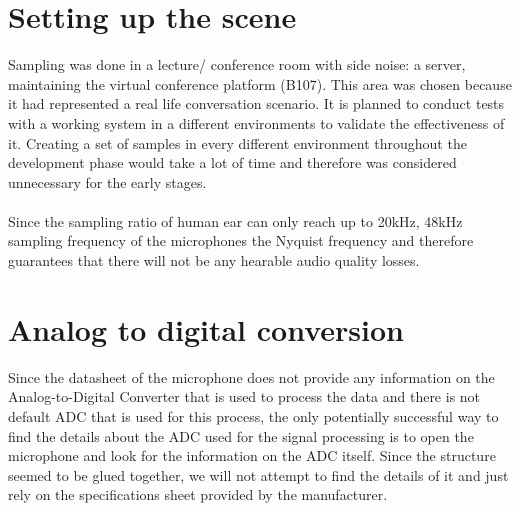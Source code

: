 \section{Setting up the scene}
Sampling was done in a lecture/ conference room with side noise: a server, maintaining the virtual conference platform (B107). This area was chosen because it had represented a real life conversation scenario. It is planned to conduct tests with a working system in a different environments to validate the effectiveness of it. Creating a set of samples in every different environment throughout the development phase would take a lot of time and therefore was considered unnecessary for the early stages. 
\paragraph{}
Since the sampling ratio of human ear can only reach up to 20kHz, 48kHz sampling frequency of the microphones the Nyquist frequency and therefore guarantees that there will not be any hearable audio quality losses.   
\section{Analog to digital conversion}
Since the datasheet of the microphone does not provide any information on the Analog-to-Digital Converter that is used to process the data and there is not default ADC that is used for this process, the only potentially successful way to find the details about the ADC used for the signal processing is to open the microphone and look for the information on the ADC itself. Since the structure seemed to be glued together, we will not attempt to find the details of it and just rely on the specifications sheet provided by the manufacturer.  
